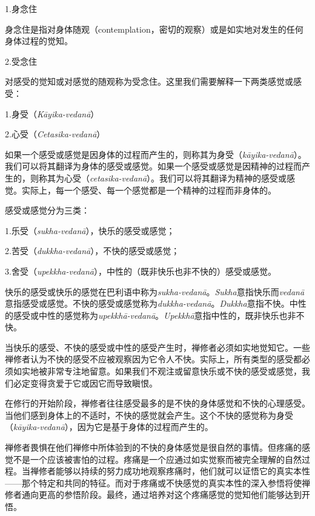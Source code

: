 \sssubsectnon 1.身念住

身念住是指对身体随观（contemplation，密切的观察）或是如实地对发生的任何身体过程的觉知。

\sssubsectnon 2.受念住

对感受的觉知或对感觉的随观称为受念住。这里我们需要解释一下两类感觉或感受：

{
\leftskip=1.6pc
\item{1.}身受（{\it K\=ayika-vedan\=a}）
\item{2.}\1心受（{\it Cetasika-vedan\=a}）

}

如果一个感受或感觉是因身体的过程而产生的，则称其为身受（{\it k\=ayika-vedan\=a}）。我们可以将其翻译为身体的感受或感觉。如果一个感受或感觉是因精神的过程而产生的，则称其为心受（{\it cetasika-vedan\=a}）。我们可以将其翻译为精神的感受或感觉。实际上，每一个感受、每一个感觉都是一个精神的过程而非身体的。

感受或感觉分为三类：

{
\leftskip=1.6pc
\item{1.}乐受（{\it sukha-vedan\=a}），快乐的感受或感觉；
\item{2.}苦受（{\it dukkha-vedan\=a}），不快的感受或感觉；
\item{3.}舍受（{\it upekkha-vedan\=a}），中性的（既非快乐也非不快的）感受或感觉。

}

快乐的感受或快乐的感觉在巴利语中称为{\it sukha-vedan\=a}。{\it Sukha}意指快乐而{\it vedan\=a}意指感受或感觉。不快的感受或感觉称为{\it dukkha-vedan\=a}。{\it Dukkha}意指不快。中性的感受或中性的感觉称为{\it upekkh\=a-vedan\=a}。{\it Upekkh\=a}意指中性的，既非快乐也非不快。

当快乐的感受、不快的感受或中性的感受产生时，禅修者必须如实地觉知它。一些禅修者认为不快的感受不应被观察因为它令人不快。实际上，所有类型的感受都必须如实地被非常专注地留意。如果我们不观注或留意快乐或不快的感受或感觉，我们必定变得贪爱于它或因它而导致瞋恨。

在修行的开始阶段，禅修者往往感受最多的是不快的身体感觉和不快的心理感受。当他们感到身体上的不适时，不快的感觉就会产生。这个\1不快的感觉称为身受（{\it k\=ayika-vedan\=a}），因为它是基于身体的过程而产生的。

禅修者畏惧在他们禅修中所体验到的不快的身体感觉是很自然的事情。但疼痛的感觉不是一个应该被害怕的过程。疼痛是一个应通过如实觉察而被完全理解的自然过程。当禅修者能够以持续的努力成功地观察疼痛时，他们就可以证悟它的真实本性——那个特定和共同的特征。而对于疼痛或不快感觉的真实本性的深入参悟将使禅修者通向更高的参悟阶段。最终，通过培养对这个疼痛感觉的觉知他们能够达到开悟。


